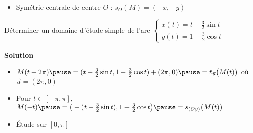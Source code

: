 \begin{frame}

\begin{itemize}
  \item Symétrie centrale de centre $O$ : $s_O(M)=(-x,-y)$
\end{itemize}



\end{frame}

\begin{frame}
\begin{exemple}
Déterminer un domaine d'étude simple de l'arc 
$\left\{
\begin{array}{l}
x(t)=t-\frac32\sin t\\
y(t)=1-\frac32\cos t
\end{array}
\right.$
\pause

\vspace*{-1ex}
\textbf{Solution}
\vspace*{-1ex}
{\small
\begin{itemize}
  \item $M(t+2\pi)\pause=(t-\tfrac32\sin t,1-\tfrac32\cos t)+(2\pi,0)\pause=t_{\vec{u}} \big(M(t)\big)$
où $\vec{u}=\!(2\pi,0)$
  \pause
  \item Pour $t\in[-\pi,\pi]$,\pause 
$M(-t)\pause=\big(-(t-\tfrac32\sin t),1-\tfrac32\cos t \big)\pause=s_{(Oy)}\big(M(t)\big)$
  \pause
  \item \'Etude sur $[0,\pi]$\pause
\end{itemize}
}
\vspace*{-4ex}
\vspace*{-5ex}\pause
{}
\vspace*{-5ex}
\end{exemple}
\end{frame}


